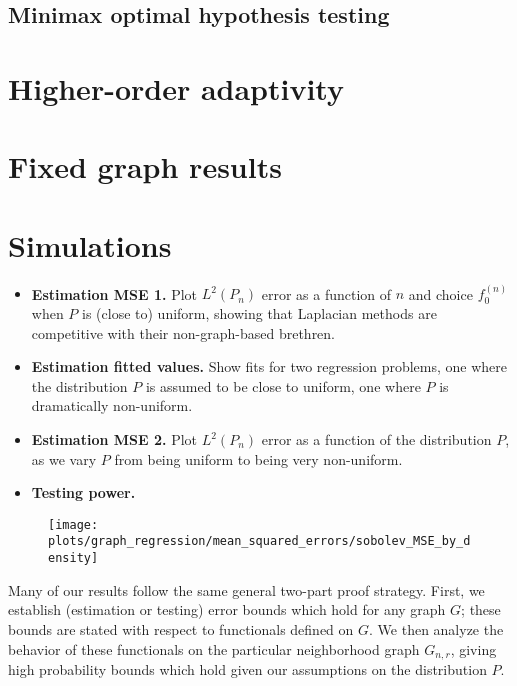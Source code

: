 \documentclass{article}
\newcommand{\1}{\mathbf{1}}
\theoremstyle{alden}
\theoremstyle{aldenthm}
\theoremstyle{definition}
\theoremstyle{remark}
\begin{document}
\subsection{Minimax optimal hypothesis testing}



\section{Higher-order adaptivity}

\section{Fixed graph results}

\section{Simulations}
\begin{itemize}
	\item \textbf{Estimation MSE 1.} Plot $L^2(P_n)$ error as a function of $n$ and choice $f_0^{(n)}$ when $P$ is (close to) uniform, showing that Laplacian methods are competitive with their non-graph-based brethren.
	\item \textbf{Estimation fitted values.} Show fits for two regression problems, one where the distribution $P$ is assumed to be close to uniform, one where $P$ is dramatically non-uniform.
	\item \textbf{Estimation MSE 2.} Plot $L^2(P_n)$ error as a function of the distribution $P$, as we vary $P$ from being uniform to being very non-uniform.
	 
	\item \textbf{Testing power.} 
\end{itemize}

\begin{figure}
	\centering
	\texttt{[image: plots/graph\_regression/mean\_squared\_errors/sobolev\_MSE\_by\_density]}
	\caption{}
	\label{fig:piecewise_cosine}
\end{figure}

\clearpage

\appendix

Many of our results follow the same general two-part proof strategy. First, we establish (estimation or testing) error bounds which hold for any graph $G$; these bounds are stated with respect to functionals defined on $G$. We then analyze the behavior of these functionals on the particular neighborhood graph $G_{n,r}$, giving high probability bounds which hold given our assumptions on the distribution $P$. 
\end{document}
